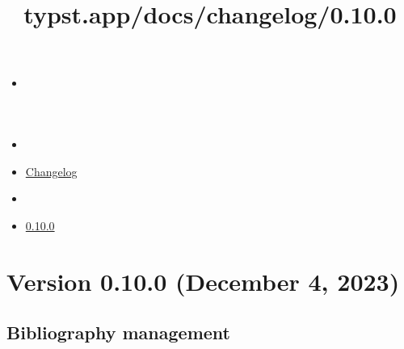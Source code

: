 \title{typst.app/docs/changelog/0.10.0}

\begin{itemize}
\tightlist
\item
  \href{/docs}{}
\item
  
\item
  \href{/docs/changelog/}{Changelog}
\item
  
\item
  \href{/docs/changelog/0.10.0/}{0.10.0}
\end{itemize}

\section{Version 0.10.0 (December 4,
2023)}\label{version-0.10.0-december-4-2023}

\subsection{Bibliography management}\label{bibliography-management}

